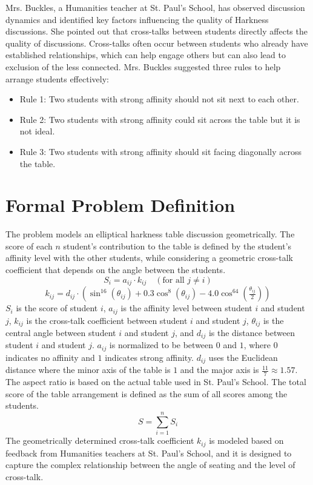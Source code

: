 \documentclass[11pt]{article}
\begin{document}
Mrs. Buckles, a Humanities teacher at St. Paul's School, has observed discussion dynamics and identified key factors influencing the quality of Harkness discussions.
She pointed out that cross-talks between students directly affects the quality of discussions.
Cross-talks often occur between students who already have established relationships, which can help engage others but can also lead to exclusion of the less connected.
Mrs. Buckles suggested three rules to help arrange students effectively:
\begin{itemize}
    \item Rule 1: Two students with strong affinity should not sit next to each other.
    \item Rule 2: Two students with strong affinity could sit across the table but it is not ideal.
    \item Rule 3: Two students with strong affinity should sit facing diagonally across the table.
\end{itemize}

\section{Formal Problem Definition}
The problem models an elliptical harkness table discussion geometrically.
The score of each $n$ student's contribution to the table is defined by the student's affinity level with the other students, while considering a geometric cross-talk coefficient that depends on the angle between the students.
\[
S_i = a_{ij} \cdot k_{ij} \quad (\text{for all } j \neq i)
\]
\[
k_{ij} = d_{ij}\cdot \left( \sin^{16}(\theta_{ij}) + 0.3\cos^8(\theta_{ij}) - 4.0\cos^{64}(\tfrac{\theta_{ij}}{2})\right)
\]
$S_i$ is the score of student $i$, $a_{ij}$ is the affinity level between student $i$ and student $j$, $k_{ij}$ is the cross-talk coefficient between student $i$ and student $j$, $\theta_{ij}$ is the central angle between student $i$ and student $j$, and $d_{ij}$ is the distance between student $i$ and student $j$.
$a_{ij}$ is normalized to be between $0$ and $1$, where $0$ indicates no affinity and $1$ indicates strong affinity. $d_{ij}$ uses the Euclidean distance where the minor axis of the table is $1$ and the major axis is $\tfrac{11}{7} \approx 1.57$. The aspect ratio is based on the actual table used in St. Paul's School.
The total score of the table arrangement is defined as the sum of all scores among the students.
\[
S = \sum_{i=1}^{n} S_i
\]
The geometrically determined cross-talk coefficient $k_{ij}$ is modeled based on feedback from Humanities teachers at St. Paul's School, and it is designed to capture the complex relationship between the angle of seating and the level of cross-talk.
\end{document}
